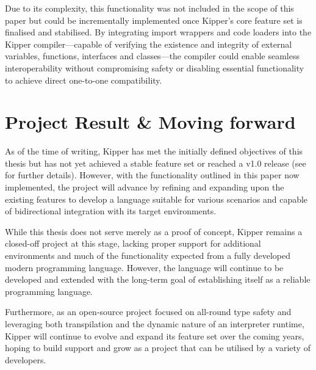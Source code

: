 Due to its complexity, this functionality was not included in the scope of this paper but could be incrementally implemented once Kipper’s core feature set is finalised and stabilised. By integrating import wrappers and code loaders into the Kipper compiler—capable of verifying the existence and integrity of external variables, functions, interfaces and classes—the compiler could enable seamless interoperability without compromising safety or disabling essential functionality to achieve direct one-to-one compatibility.

\section{Project Result \& Moving forward}

As of the time of writing, Kipper has met the initially defined objectives of this thesis but has not yet achieved a stable feature set or reached a v1.0 release (see  for further details). However, with the functionality outlined in this paper now implemented, the project will advance by refining and expanding upon the existing features to develop a language suitable for various scenarios and capable of bidirectional integration with its target environments.

While this thesis does not serve merely as a proof of concept, Kipper remains a closed-off project at this stage, lacking proper support for additional environments and much of the functionality expected from a fully developed modern programming language. However, the language will continue to be developed and extended with the long-term goal of establishing itself as a reliable programming language.

Furthermore, as an open-source project focused on all-round type safety and leveraging both \gls{transpilation} and the dynamic nature of an interpreter runtime, Kipper will continue to evolve and expand its feature set over the coming years, hoping to build support and grow as a project that can be utilised by a variety of developers.

